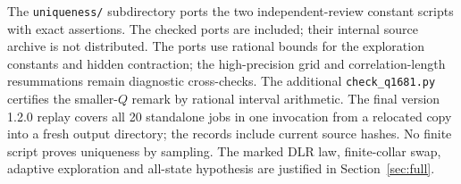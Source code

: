 The \texttt{uniqueness/} subdirectory ports the two independent-review constant scripts with exact assertions. The checked ports are included; their internal source archive is not distributed. The ports use rational bounds for the exploration constants and hidden contraction; the high-precision grid and correlation-length resummations remain diagnostic cross-checks. The additional \texttt{check\_q1681.py} certifies the smaller-$Q$ remark by rational interval arithmetic. The final version 1.2.0 replay covers all 20 standalone jobs in one invocation from a relocated copy into a fresh output directory; the records include current source hashes. No finite script proves uniqueness by sampling. The marked DLR law, finite-collar swap, adaptive exploration and all-state hypothesis are justified in Section~\ref{sec:full}.
